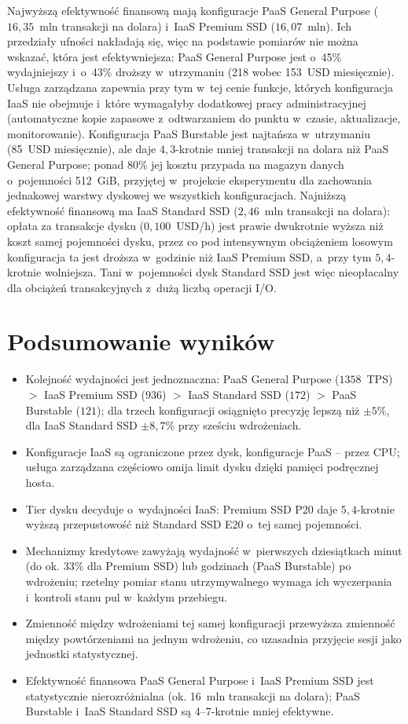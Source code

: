 Najwyższą efektywność finansową mają konfiguracje PaaS General Purpose ($16{,}35$~mln
transakcji na dolara) i~IaaS Premium SSD ($16{,}07$~mln). Ich przedziały ufności nakładają
się, więc na podstawie pomiarów nie można wskazać, która jest efektywniejsza: PaaS General
Purpose jest o~45\% wydajniejszy i~o~43\% droższy w~utrzymaniu (218 wobec 153~USD miesięcznie).
Usługa zarządzana zapewnia przy tym w~tej cenie funkcje, których konfiguracja IaaS nie
obejmuje i~które wymagałyby dodatkowej pracy administracyjnej (automatyczne kopie zapasowe
z~odtwarzaniem do punktu w~czasie, aktualizacje, monitorowanie). Konfiguracja PaaS Burstable
jest najtańsza w~utrzymaniu (85~USD miesięcznie), ale daje $4{,}3$-krotnie mniej transakcji
na dolara niż PaaS General Purpose; ponad 80\% jej kosztu przypada na magazyn danych
o~pojemności 512~GiB, przyjętej w~projekcie eksperymentu dla zachowania jednakowej warstwy
dyskowej we wszystkich konfiguracjach. Najniższą efektywność finansową ma IaaS Standard SSD
($2{,}46$~mln transakcji na dolara): opłata za transakcje dysku ($0{,}100$~USD/h) jest prawie
dwukrotnie wyższa niż koszt samej pojemności dysku, przez co pod intensywnym obciążeniem
losowym konfiguracja ta jest droższa w~godzinie niż IaaS Premium SSD, a~przy tym $5{,}4$-krotnie
wolniejsza. Tani w~pojemności dysk Standard SSD jest więc nieopłacalny dla obciążeń
transakcyjnych z~dużą liczbą operacji I/O.

\section{Podsumowanie wyników}
\label{sec:wyniki-podsumowanie}

\begin{itemize}
  \item Kolejność wydajności jest jednoznaczna: PaaS General Purpose ($1358$~TPS) $>$ IaaS
  Premium SSD ($936$) $>$ IaaS Standard SSD ($172$) $>$ PaaS Burstable ($121$); dla trzech
  konfiguracji osiągnięto precyzję lepszą niż $\pm5\%$, dla IaaS Standard SSD $\pm8{,}7\%$
  przy sześciu wdrożeniach.
  \item Konfiguracje IaaS są ograniczone przez dysk, konfiguracje PaaS -- przez CPU;
  usługa zarządzana częściowo omija limit dysku dzięki pamięci podręcznej hosta.
  \item Tier dysku decyduje o~wydajności IaaS: Premium SSD P20 daje $5{,}4$-krotnie wyższą
  przepustowość niż Standard SSD E20 o~tej samej pojemności.
  \item Mechanizmy kredytowe zawyżają wydajność w~pierwszych dziesiątkach minut (do
  ok. 33\% dla Premium SSD) lub godzinach (PaaS Burstable) po wdrożeniu; rzetelny pomiar
  stanu utrzymywalnego wymaga ich wyczerpania i~kontroli stanu pul w~każdym przebiegu.
  \item Zmienność między wdrożeniami tej samej konfiguracji przewyższa zmienność między
  powtórzeniami na jednym wdrożeniu, co uzasadnia przyjęcie sesji jako jednostki statystycznej.
  \item Efektywność finansowa PaaS General Purpose i~IaaS Premium SSD jest statystycznie
  nierozróżnialna (ok. 16~mln transakcji na dolara); PaaS Burstable i~IaaS Standard SSD są
  4--7-krotnie mniej efektywne.
\end{itemize}
